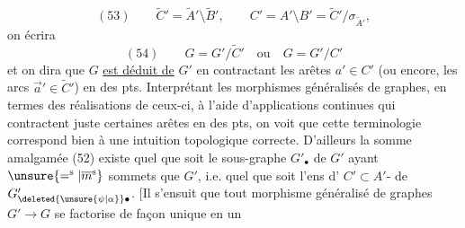 \[
(53)\qquad\widetilde C'=\widetilde A'\setminus\widetilde B',\qquad C'=A'\setminus B'=\widetilde C'/\sigma_{\widetilde A'},
\]
on écrira
\[
(54)\qquad G=G'/\widetilde C'\quad\text{ou}\quad G=G'/C'
\]
et on dira que $G$ \uline{est déduit de} $G'$ en contractant les arêtes $a'\in C'$ (ou encore, les arcs $\vec a'\in\widetilde C'$) en des pts. Interprétant les morphismes généralisés de graphes, en termes des réalisations  de ceux-ci, à l'aide d'applications continues qui contractent juste certaines arêtes en des pts, on voit que cette terminologie correspond bien à une intuition topologique correcte. D'ailleurs la somme amalgamée (52) existe quel que soit le sous-graphe $G'_\bullet$ de $G'$ ayant $\unsure{=^{\mathrm s}|\overline m^{\mathrm s}}$ sommets que $G'$, i.e. quel que soit l'ens d' $C'\subset A'$- de $G'_{\deleted{\unsure{\psi|\alpha}}\bullet}$. [Il s'ensuit que tout morphisme généralisé de graphes $G'\longrightarrow G$ se factorise de façon unique en un
